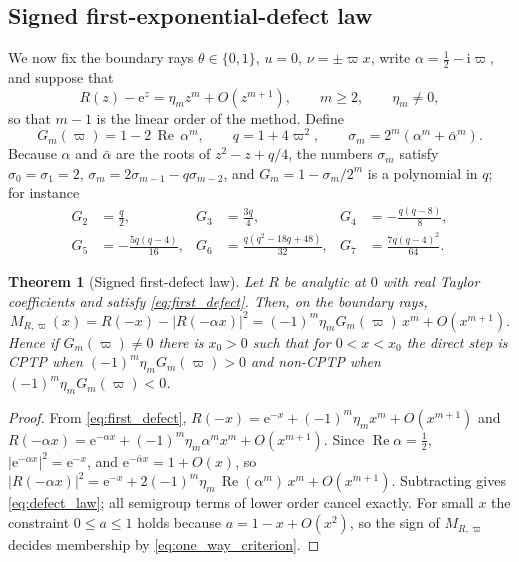 \documentclass[pdflatex,sn-mathphys-num]{sn-jnl}
\renewcommand{\Re}{\operatorname{Re}}
\newcommand{\e}{\mathrm{e}}
\newcommand{\ii}{\mathrm{i}}
\newcommand{\Mmargin}{M_{R,\varpi}}
\theoremstyle{thmstyleone}
\newtheorem{theorem}{Theorem}
\theoremstyle{thmstylethree}
\theoremstyle{thmstyletwo}
\begin{document}
\subsection{Signed first-exponential-defect law}\label{sec:defect}

We now fix the boundary rays $\theta\in\{0,1\}$, $u=0$, $\nu=\pm\varpi x$, write $\alpha=\tfrac12-\ii\varpi$, and suppose that
\begin{equation}
 R(z)-\e^z=\eta_mz^m+O(z^{m+1}),\qquad m\ge2,\qquad \eta_m\ne0,
 \label{eq:first_defect}
\end{equation}
so that $m-1$ is the linear order of the method. Define
\begin{equation}
 G_m(\varpi)=1-2\,\Re\,\alpha^m,\qquad q=1+4\varpi^2,\qquad \sigma_m=2^m(\alpha^m+\bar\alpha^m).
 \label{eq:G_definition}
\end{equation}
Because $\alpha$ and $\bar\alpha$ are the roots of $z^2-z+q/4$, the numbers $\sigma_m$ satisfy $\sigma_0=\sigma_1=2$, $\sigma_m=2\sigma_{m-1}-q\sigma_{m-2}$, and $G_m=1-\sigma_m/2^m$ is a polynomial in $q$; for instance
\begin{equation}
\begin{aligned}
 G_2&=\frac q2,& G_3&=\frac{3q}{4},& G_4&=-\frac{q(q-8)}{8},\\
 G_5&=-\frac{5q(q-4)}{16},& G_6&=\frac{q(q^2-18q+48)}{32},& G_7&=\frac{7q(q-4)^2}{64}.
\end{aligned}
 \label{eq:G_factors}
\end{equation}

\begin{theorem}[Signed first-defect law]\label{thm:defect}
Let $R$ be analytic at $0$ with real Taylor coefficients and satisfy \eqref{eq:first_defect}. Then, on the boundary rays,
\begin{equation}
 \Mmargin(x)=R(-x)-\big|R(-\alpha x)\big|^2=(-1)^m\eta_mG_m(\varpi)\,x^m+O(x^{m+1}).
 \label{eq:defect_law}
\end{equation}
Hence if $G_m(\varpi)\ne0$ there is $x_0>0$ such that for $0<x<x_0$ the direct step is CPTP when $(-1)^m\eta_mG_m(\varpi)>0$ and non-CPTP when $(-1)^m\eta_mG_m(\varpi)<0$.
\end{theorem}

\begin{proof}
From \eqref{eq:first_defect}, $R(-x)=\e^{-x}+(-1)^m\eta_mx^m+O(x^{m+1})$ and $R(-\alpha x)=\e^{-\alpha x}+(-1)^m\eta_m\alpha^mx^m+O(x^{m+1})$. Since $\Re\alpha=\tfrac12$, $|\e^{-\alpha x}|^2=\e^{-x}$, and $\e^{-\bar\alpha x}=1+O(x)$, so
$|R(-\alpha x)|^2=\e^{-x}+2(-1)^m\eta_m\,\Re(\alpha^m)\,x^m+O(x^{m+1})$. Subtracting gives \eqref{eq:defect_law}; all semigroup terms of lower order cancel exactly. For small $x$ the constraint $0\le a\le1$ holds because $a=1-x+O(x^2)$, so the sign of $\Mmargin$ decides membership by \eqref{eq:one_way_criterion}.
\end{proof}
\end{document}
